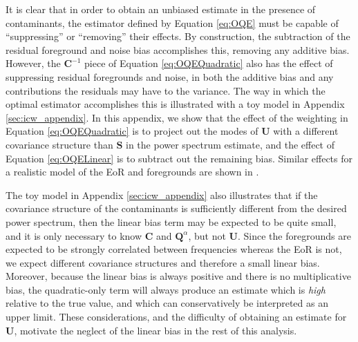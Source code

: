 \documentclass[preprint2,numberedappendix,tighten]{aastex6}  %
\newcommand{\C}{\mathbf{C}}
\begin{document}
It is clear that in order to obtain an unbiased estimate in the presence of contaminants, the estimator defined by Equation \eqref{eq:OQE} must be capable of ``suppressing'' or ``removing'' their effects. By construction, the subtraction of the residual foreground and noise bias accomplishes this, removing any additive bias. However, the $\mathbf{C}^{-1}$ piece of Equation \eqref{eq:OQEQuadratic} also has the effect of suppressing residual foregrounds and noise, in both the additive bias and any contributions the residuals may have to the variance. The way in which the optimal estimator accomplishes this is illustrated with a toy model in Appendix \ref{sec:icw_appendix}. In this appendix, we show that the effect of the weighting in Equation \ref{eq:OQEQuadratic} is to project out the modes of $\textbf{U}$ with a different covariance structure than $\mathbf{S}$ in the power spectrum estimate, and the effect of Equation \ref{eq:OQELinear} is to subtract out the remaining bias. Similar effects for a realistic model of the EoR and foregrounds are shown in \citet{liu_tegmark2011}.

The toy model in Appendix \ref{sec:icw_appendix} also illustrates that if the covariance structure of the contaminants is sufficiently different from the desired power spectrum, then the linear bias term may be expected to be quite small, and it is only necessary to know $\C$ and $\textbf{Q}^{\alpha}$, but not $\mathbf{U}$. Since the foregrounds are expected to be strongly correlated between frequencies whereas the EoR is not, we expect different covariance structures and therefore a small linear bias. Moreover, because the linear bias is always positive and there is no multiplicative bias, the quadratic-only term will always produce an estimate which is {\it high} relative to the true value, and which can conservatively be interpreted as an upper limit. These considerations, and the difficulty of obtaining an estimate for $\mathbf{U}$, motivate the neglect of the linear bias in the rest of this analysis.
\end{document}
